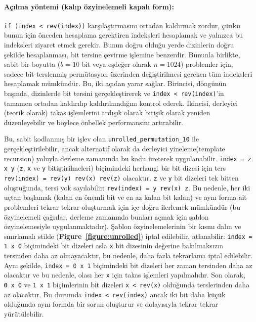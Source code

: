\documentclass[10pt]{article}
\begin{document}
\paragraph{A\c{c}{\i}lma y\"{o}ntemi (kal{\i}p \"{o}zyinelemeli kapal{\i} form):}

{\tt if (index < rev(index))} kar\c{s}{\i}la\c{s}t{\i}rmas{\i}n{\i} ortadan kald{\i}rmak zordur, \c{c}\"{u}nk\"{u} bunun i\c{c}in
\"{o}nceden hesaplama gerektiren indeksleri hesaplamak ve yaln{\i}zca bu indeksleri ziyaret etmek gerekir.
Bunun do\u{g}ru oldu\u{g}u yerde dizinlerin do\u{g}ru \c{s}ekilde hesaplanmas{\i}, bit tersine \c{c}evirme 
i\c{s}lemine benzerdir. Bununla birlikte, sabit bir boyutta ($b = 10$ bit veya e\c{s}de\u{g}er olarak $n = 1024$)
problemler i\c{c}in, sadece bit-terslenmi\c{s} perm\"{u}tasyon \"{u}zerinden de\u{g}i\c{s}tirilmesi gereken t\"{u}m
indeksleri hesaplamak m\"{u}mk\"{u}nd\"{u}r. Bu, iki a\c{c}{\i}dan yarar sa\u{g}lar. 
Birincisi, d\"{o}ng\"{u}n\"{u}n ba\c{s}{\i}nda, dizinlerde bit tersini ger\c{c}ekle\c{s}tirerek ve {\tt index < rev(index)}'in
tamamen ortadan kald{\i}r{\i}l{\i}p kald{\i}r{\i}lmad{\i}\u{g}{\i}n{\i} kontrol ederek. \.{I}kincisi, derleyici (teorik olarak)
takas i\c{s}lemlerini ard{\i}\c{s}{\i}k olarak biti\c{s}ik olarak yeniden d\"{u}zenleyebilir 
ve b\"{o}ylece \"{o}nbellek performans{\i}n{\i} art{\i}rabilir.

Bu, sabit kodlanm{\i}\c{s} bir i\c{s}lev olan {\tt unrolled\_permutation\_10} ile ger\c{c}ekle\c{s}tirilebilir,
ancak alternatif olarak da derleyici yineleme(template recursion) yoluyla derleme 
zaman{\i}nda bu kodu \"{u}reterek uygulanabilir. {\tt index = z x y} ({\tt z}, {\tt x} ve {\tt y}
biti\c{s}tirilmeleri) bi\c{c}imindeki herhangi bir bit dizesi i\c{c}in 
ters {\tt rev(index) = rev(y) rev(x)   rev(z)} olacakt{\i}r. {\tt z} ve {\tt y} 
bit dizeleri tek bitten olu\c{s}tu\u{g}unda, tersi yok say{\i}labilir: {\tt rev(index) = y   rev(x) z}.
Bu nedenle, her iki u\c{c}tan ba\c{s}lamak (kalan en \"{o}nemli bit ve en az kalan bit kalan) ve
ayn{\i} forma ait problemleri tekrar tekrar olu\c{s}turmak i\c{c}in i\c{c}e do\u{g}ru ilerlemek m\"{u}mk\"{u}nd\"{u}r 
(bu \"{o}zyinelemeli \c{c}a\u{g}r{\i}lar, derleme zaman{\i}nda bunlar{\i} a\c{c}mak i\c{c}in \c{s}ablon \"{o}zyinelemesiyle
uygulanmaktad{\i}r). \c{S}ablon \"{o}zyinelemelerinin bir k{\i}sm{\i} dal{\i}n ve s{\i}n{\i}rlamal{\i} stilde 
({\bf Figure~\ref{figure:unrolled}}) iptal edilebilir, atlanabilir: {\tt index =   1~x~0} bi\c{c}imindeki
bit dizeleri asla {\tt x} bit dizesinin de\u{g}erine bak{\i}lmaks{\i}z{\i}n tersinden daha az olmayacakt{\i}r,
bu nedenle, daha fazla tekrarlama iptal edilebilir. Ayn{\i} \c{s}ekilde, {\tt index = 0~x~1} 
bi\c{c}imindeki bit dizeleri her zaman tersinden daha az olacakt{\i}r ve bu nedenle, 
olas{\i} her {\tt x} i\c{c}in takas i\c{s}lemleri yap{\i}lmal{\i}d{\i}r. Son olarak, {\tt 0~x~0} ve
{\tt 1~x~1} bi\c{c}imlerinin bit dizeleri {\tt x < rev(x)} oldu\u{g}unda terslerinden daha 
az olacakt{\i}r. Bu durumda {\tt index < rev(index)} ancak iki bit daha k\"{u}\c{c}\"{u}k 
oldu\u{g}unda ayn{\i} formda bir sorun olu\c{s}turur ve dolay{\i}s{\i}yla tekrar tekrar y\"{u}r\"{u}t\"{u}lebilir.
\end{document}
